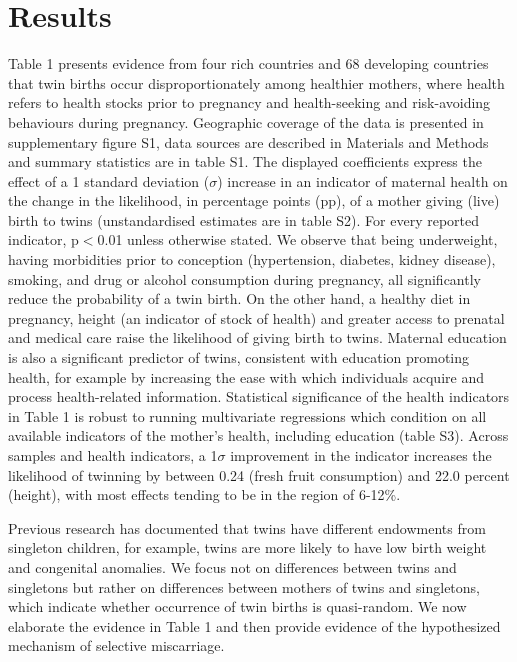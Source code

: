 \documentclass[11pt]{article}
\begin{document}
\section*{Results}
Table 1 presents evidence from four rich countries and 68 developing countries that twin births occur disproportionately among healthier mothers, where health refers to health stocks prior to pregnancy and health-seeking and risk-avoiding behaviours during pregnancy. Geographic coverage of the data is presented in supplementary figure S1, data sources are described in Materials and Methods and summary statistics are in table S1. The displayed coefficients express the effect of a 1 standard deviation ($\sigma$) increase in an indicator of maternal health on the change in the likelihood, in percentage points (pp), of a mother giving (live) birth to twins (unstandardised estimates are in table S2). For every reported indicator, p$<$0.01 unless otherwise stated. We observe that being underweight, having morbidities prior to conception (hypertension, diabetes, kidney disease), smoking, and drug or alcohol consumption during pregnancy, all significantly reduce the probability of a twin birth. On the other hand, a healthy diet in pregnancy, height (an indicator of stock of health\cite{Silventoinen2003,BhalotraRawlings2013}) and greater access to prenatal and medical care raise the likelihood of giving birth to twins. Maternal education is also a significant predictor of twins, consistent with education promoting health, for example by increasing the ease with which individuals acquire and process health-related information\cite{Kenkel1991,CutlerLlerasMuney2010}. Statistical significance of the health indicators in Table 1 is robust to running multivariate regressions which condition on all available indicators of the mother's health, including education (table S3).  Across samples and health indicators, a 1$\sigma$ improvement in the indicator increases the likelihood of twinning by between 0.24 (fresh fruit consumption) and 22.0 percent (height), with most effects tending to be in the region of 6-12\%.

Previous research has documented that twins have different endowments from singleton children, for example, twins are more likely to have low birth weight and congenital anomalies\cite{Hall2003}. We focus not on differences between twins and singletons but rather on differences between mothers of twins and singletons, which indicate whether occurrence of twin births is quasi-random. We now elaborate the evidence in Table 1 and then provide evidence of the hypothesized mechanism of selective miscarriage.
\end{document}
